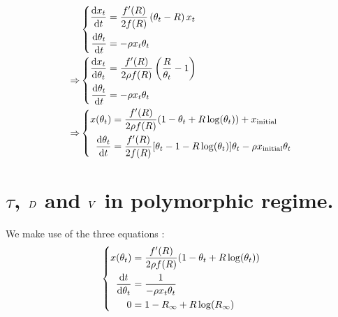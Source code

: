 \documentclass{article}
\begin{document}
\begin{align} 
& \left\{
      \begin{aligned}
          \dfrac{\mathrm{d} x_{t}}{\mathrm{d} t} &= \dfrac{f'(R )}{2 f(R )} \left( \theta_{t}  - R \right) x_{t} \\
        \dfrac{\mathrm{d} \theta_{t}}{\mathrm{d} t} &= 
        - \rho x_{t} \theta_{t} \\
      \end{aligned}
\right. \\
 \Rightarrow
 & \left\{
      \begin{aligned}
          \dfrac{\mathrm{d} x_{t}}{\mathrm{d} \theta_{t} } &= \dfrac{f'(R )}{2 \rho f(R )}\left( \dfrac{R }{\theta_{t} } -1 \right) \\
        \dfrac{\mathrm{d} \theta_{t} }{\mathrm{d} t} &= 
        - \rho x_{t} \theta_{t} \\
      \end{aligned}
    \right. \\
 \Rightarrow
  & \left\{
      \begin{aligned}
         x(\theta_{t} ) &=\dfrac{f'(R)}{2 \rho f(R )} (1- \theta_{t}  + R  \operatorname{log}(\theta_{t} )) + x_{\mathrm{initial}}  \\
        \dfrac{\mathrm{d} \theta_{t} }{\mathrm{d} t} &= 
         \dfrac{f'(R )}{2 f(R )} [ \theta_{t} -1- R  \operatorname{log}(\theta_{t} )]\theta_{t}   - \rho x_{\mathrm{initial}} \theta_{t} \\
      \end{aligned}
    \right.
\end{align}

\section*{$\tau$, $D$ and $V$ in polymorphic regime.}
We make use of the three equations :  
\begin{equation}
\left\{
  \begin{aligned}
         x(\theta_{t} ) &= \dfrac{f'(R)}{2 \rho f(R )} (1- \theta_{t}  + R  \operatorname{log}(\theta_{t} )) \\
         \dfrac{\mathrm{d} t }{\mathrm{d} \theta_{t}} &= \dfrac{1}{-\rho x_{t} \theta_{t}} \\
        0 &= 1-{R_{\infty}}  + R  \operatorname{log}({R_{\infty}} )  \\
  \end{aligned}
   \right.
\end{equation}
\end{document}

